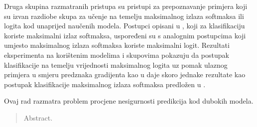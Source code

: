 \documentclass[utf8, diplomski, lmodern]{fer}
\begin{document}
Druga skupina razmatranih pristupa su pristupi za prepoznavanje primjera koji su izvan razdiobe skupa za učenje \citet{Guo:2017:CMNN,Hendrycks:2016:BDMOODE,Liang:2017:PDOODENN} na temelju maksimalnog izlaza softmaksa ili logita kod unaprijed naučenih modela. Postupci opisani u \citet{Hendrycks:2016:BDMOODE,Liang:2017:PDOODENN}, koji za klasifikaciju koriste maksimalni izlaz softmaksa, uspoređeni su s analognim postupcima koji umjesto maksimalnog izlaza softmaksa koriste maksimalni logit. Rezultati eksperimenta na korištenim modelima i skupovima pokazuju da postupak klasifikacije na temelju vrijednosti maksimalnog logita uz pomak ulaznog primjera u smjeru predznaka gradijenta kao u \cite{Liang:2017:PDOODENN} daje skoro jednake rezultate kao postupak klasifikacije maksimalnog izlaza softmaksa predložen u \cite{Liang:2017:PDOODENN}.




 



\begin{sazetak}

Ovaj rad razmatra problem procjene nesigurnosti predikcija kod dubokih modela.

\end{sazetak}

\begin{abstract}
Abstract.

\end{abstract}
\end{document}
